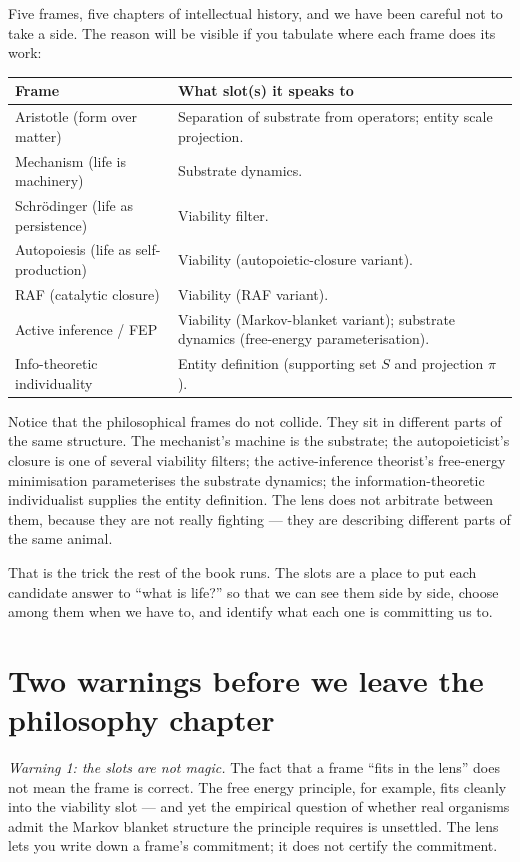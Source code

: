 Five frames, five chapters of intellectual history, and we have been
careful not to take a side. The reason will be visible if you tabulate
where each frame does its work:

\begin{center}
\begin{tabular}{@{}p{}p{}@{}}
\hline
\textbf{Frame} & \textbf{What slot(s) it speaks to} \\
\hline
Aristotle (form over matter) &
  Separation of substrate from operators; entity scale projection. \\
Mechanism (life is machinery) &
  Substrate dynamics. \\
Schr\"odinger (life as persistence) &
  Viability filter. \\
Autopoiesis (life as self-production) &
  Viability (autopoietic-closure variant). \\
RAF (catalytic closure) &
  Viability (RAF variant). \\
Active inference / FEP &
  Viability (Markov-blanket variant); substrate dynamics
  (free-energy parameterisation). \\
Info-theoretic individuality &
  Entity definition (supporting set $S$ and projection $\pi$). \\
\hline
\end{tabular}
\end{center}

Notice that the philosophical frames do not collide. They sit in
different parts of the same structure. The mechanist's machine is the
substrate; the autopoieticist's closure is one of several viability
filters; the active-inference theorist's free-energy minimisation
parameterises the substrate dynamics; the information-theoretic
individualist supplies the entity definition. The lens does not arbitrate
between them, because they are not really fighting --- they are
describing different parts of the same animal.

That is the trick the rest of the book runs. The slots are a place to
put each candidate answer to ``what is life?'' so that we can see them
side by side, choose among them when we have to, and identify what each
one is committing us to.

\section{Two warnings before we leave the philosophy chapter}

\textit{Warning 1: the slots are not magic.} The fact that a frame ``fits
in the lens'' does not mean the frame is correct. The free energy
principle, for example, fits cleanly into the viability slot --- and yet
the empirical question of whether real organisms admit the Markov
blanket structure the principle requires is unsettled. The lens lets you
write down a frame's commitment; it does not certify the commitment.

